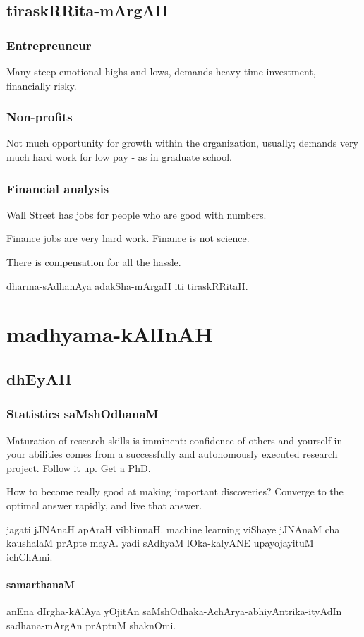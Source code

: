 \documentclass[oneside, article]{memoir}
\begin{document}
\subsection{tiraskRRita-mArgAH}
\subsubsection{Entrepreuneur}
Many steep emotional highs and lows, demands heavy time investment, financially risky.

\subsubsection{Non-profits}
Not much opportunity for growth within the organization, usually; demands very much hard work for low pay - as in graduate school.

\subsubsection{Financial analysis}
Wall Street has jobs for people who are good with numbers.

Finance jobs are very hard work.
Finance is not science.

There is compensation for all the hassle.

dharma-sAdhanAya adakSha-mArgaH iti tiraskRRitaH.

\section{madhyama-kAlInAH}
\subsection{dhEyAH}
\subsubsection{Statistics saMshOdhanaM}
Maturation of research skills is imminent: confidence of others and yourself in your abilities comes from a successfully and autonomously executed research project. Follow it up. Get a PhD.

How to become really good at making important discoveries? Converge to the optimal answer rapidly, and live that answer.

jagati jJNAnaH apAraH vibhinnaH. machine learning viShaye jJNAnaM cha kaushalaM prApte mayA. yadi sAdhyaM lOka-kalyANE upayojayituM ichChAmi.

\paragraph{samarthanaM}
anEna dIrgha-kAlAya yOjitAn saMshOdhaka-AchArya-abhiyAntrika-ityAdIn sadhana-mArgAn prAptuM shaknOmi.
\end{document}
